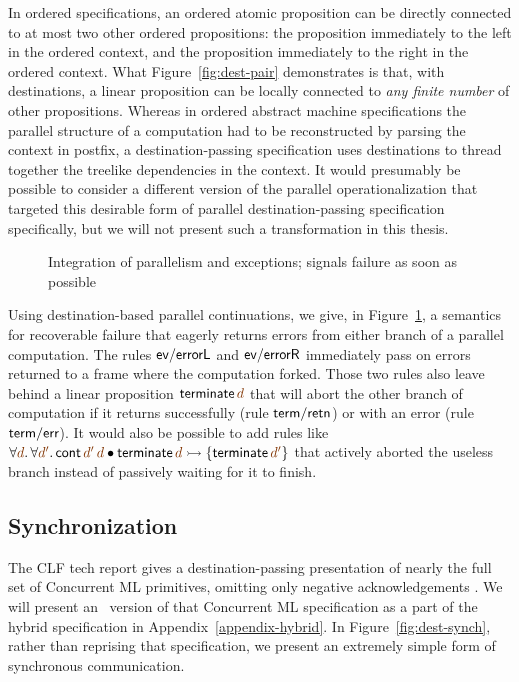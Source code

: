 In ordered specifications, an ordered atomic proposition can be
directly connected to at most two other ordered propositions: the
proposition immediately to the left in the ordered context, and the
proposition immediately to the right in the ordered context. What
Figure~\ref{fig:dest-pair} demonstrates is that, with destinations, a
linear proposition can be locally connected to {\it any finite number}
of other propositions. Whereas in ordered abstract machine
specifications the parallel structure of a computation had to be
reconstructed by parsing the context in postfix, a
destination-passing specification uses destinations to thread together
the treelike dependencies in the context. It would presumably be
possible to consider a different version of the parallel
operationalization that targeted this desirable form of 
parallel destination-passing
specification specifically, but we will not present such a
transformation in this thesis. 

\begin{figure}
\caption{Integration of parallelism and exceptions; signals failure as
  soon as possible}
\label{fig:dest-fail-paror}
\end{figure}

Using destination-based parallel continuations, we give, in
Figure~\ref{fig:dest-fail-paror}, a semantics for recoverable failure
that eagerly returns errors from either branch of a parallel
computation. The rules ${\sf ev/errorL}$ and ${\sf ev/errorR}$
immediately pass on errors returned to a frame where the computation
forked.  Those two rules also leave behind a linear proposition ${\sf
  terminate}\,\lf{d}$ that will abort the other branch of computation if it
returns successfully (rule ${\sf term/retn}$) or with an error (rule
${\sf term/err}$). It would also be possible to add rules
like $\forall \lf{d}.\,\forall\lf{d'}.\,{\sf cont}\,\lf{d'}\,\lf{d} \fuse {\sf terminate}\,\lf{d} \lefti \{ {\sf
  terminate}\,\lf{d'} \}$ that actively aborted the useless branch instead
of passively waiting for it to finish.

\subsection{Synchronization}
\label{sec:dest-synch}

The CLF tech report gives a destination-passing presentation of
nearly the full set of Concurrent ML primitives, omitting only
negative acknowledgements \cite{cervesato02concurrent}. We will
present an \sls~version of that Concurrent ML specification as a part
of the hybrid specification in Appendix~\ref{appendix-hybrid}.
In Figure~\ref{fig:dest-synch}, rather than reprising that
specification, we present an extremely simple form of synchronous
communication.


